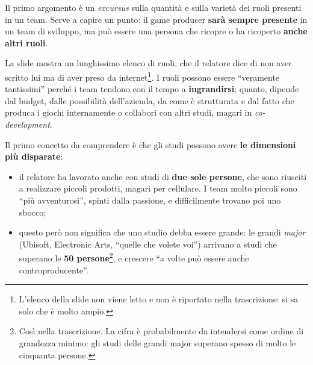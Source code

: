 Il primo argomento è un \emph{excursus} sulla quantità e sulla varietà dei
ruoli presenti in un team. Serve a capire un punto: il game producer
\textbf{sarà sempre presente} in un team di sviluppo, ma può essere una persona
che ricopre o ha ricoperto \textbf{anche altri ruoli}.

La slide mostra un lunghissimo elenco di ruoli, che il relatore dice di non aver
scritto lui ma di aver preso da internet\footnote{L'elenco della slide non viene
letto e non è riportato nella trascrizione: si sa solo che è molto ampio.}.
I ruoli possono essere ``veramente tantissimi'' perché i team tendono con il
tempo a \textbf{ingrandirsi}; quanto, dipende dal budget, dalle possibilità
dell'azienda, da come è strutturata e dal fatto che produca i giochi
internamente o collabori con altri studi, magari in \emph{co-development}.

Il primo concetto da comprendere è che gli studi possono avere \textbf{le
dimensioni più disparate}:
\begin{itemize}
  \item il relatore ha lavorato anche con studi di \textbf{due sole persone},
        che sono riusciti a realizzare piccoli prodotti, magari per cellulare.
        I team molto piccoli sono ``più avventurosi'', spinti dalla passione, e
        difficilmente trovano poi uno sbocco;
  \item questo però non significa che uno studio debba essere grande: le grandi
        \emph{major} (Ubisoft, Electronic Arts, ``quelle che volete voi'')
        arrivano a studi che superano le \textbf{50 persone}\footnote{Così nella
        trascrizione. La cifra è probabilmente da intendersi come ordine di
        grandezza minimo: gli studi delle grandi major superano spesso di molto
        le cinquanta persone.}, e crescere ``a volte può essere anche
        controproducente''.
\end{itemize}

